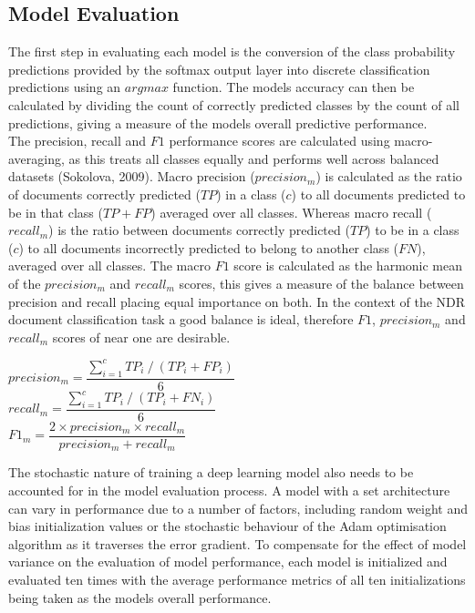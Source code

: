 \documentclass[a4paper,12pt]{article}
\begin{document}
\subsection{Model Evaluation}
The first step in evaluating each model is the conversion of the class probability predictions provided by the softmax output layer into discrete classification predictions using an $argmax$ function. The models accuracy can then be calculated by dividing the count of correctly predicted classes by the count of all predictions, giving a measure of the models overall predictive performance.\\

The precision, recall and $F1$ performance scores are calculated using macro-averaging, as this treats all classes equally and performs well across balanced datasets (Sokolova, 2009). Macro precision ($precision_m$) is calculated as the ratio of documents correctly predicted ($TP$) in a class ($c$) to all documents predicted to be in that class ($TP + FP$) averaged over all classes. Whereas macro recall ($recall_m$) is the ratio between documents correctly predicted ($TP$) to be in a class ($c$) to all documents incorrectly predicted to belong to another class ($FN$), averaged over all classes. The macro $F1$ score is calculated as the harmonic mean of the $precision_m$ and $recall_m$ scores, this gives a measure of the balance between precision and recall placing equal importance on both. In the context of the NDR document classification task a good balance is ideal, therefore $F1$, $precision_m$ and $recall_m$ scores of near one are desirable.\\

\begin{center}
$precision_m = \dfrac{\sum_{i=1}^{c}TP_i\  /\ (TP_i + FP_i)}{6} $\\
\vspace{0.5cm}
$recall_m = \dfrac{\sum_{i=1}^{c}TP_i\   /\   (TP_i + FN_i)}{6} $\\
\vspace{0.5cm}
$F1_m = \dfrac{2 \times precision_m \times recall_m}{precision_m + recall_m} $\\
\end{center}
\vspace{0.5cm}

The stochastic nature of training a deep learning model also needs to be accounted for in the model evaluation process. A model with a set architecture can vary in performance due to a number of factors, including random weight and bias initialization values or the stochastic behaviour of the Adam optimisation algorithm as it traverses the error gradient. To compensate for the effect of model variance on the evaluation of model performance, each model is initialized and evaluated ten times with the average performance metrics of all ten initializations being taken as the models overall performance.\\
\end{document}
